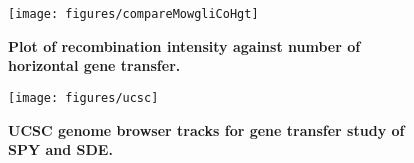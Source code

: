 \documentclass[10pt]{article}
\begin{document}
\begin{figure}[!ht]
\begin{center}
\texttt{[image: figures/compareMowgliCoHgt]}
\end{center}
\caption{
\bf{Plot of recombination intensity against number
of horizontal gene transfer.}}
\label{fig:cmpcomowglihgt}
\end{figure}
\clearpage{}


\begin{figure}[!ht]
\texttt{[image: figures/ucsc]}
\caption{
\bf{UCSC genome browser tracks for gene transfer study of
SPY and SDE.}}
\label{fig:ucsc}
\end{figure}
\clearpage{}%
\end{document}
